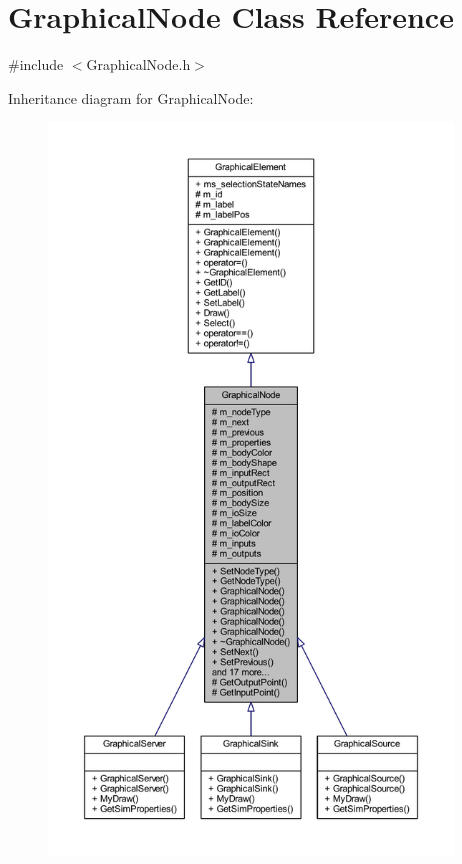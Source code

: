 \hypertarget{class_graphical_node}{}\section{Graphical\+Node Class Reference}
\label{class_graphical_node}


{\ttfamily \#include $<$Graphical\+Node.\+h$>$}



Inheritance diagram for Graphical\+Node\+:
\nopagebreak
\begin{figure}[H]
\begin{center}
\leavevmode
\includegraphics[height=550pt]{class_graphical_node__inherit__graph}
\end{center}
\end{figure}


